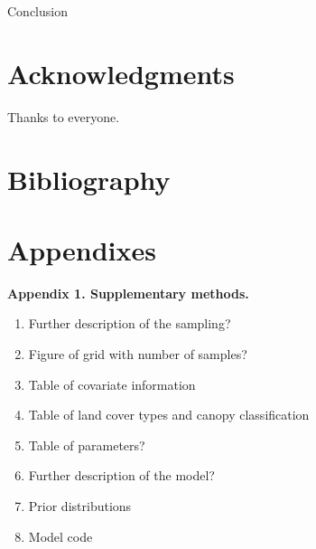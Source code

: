 \documentclass[preprint,review,times,12pt]{elsarticle}
\begin{document}
Conclusion



\section{Acknowledgments}
Thanks to everyone.

\newpage
\section{Bibliography}




\newpage
\section{Appendixes}
\textbf{Appendix 1. Supplementary methods.}
\begin{enumerate}
    \item Further description of the sampling?
    \item Figure of grid with number of samples?
    \item Table of covariate information
    \item Table of land cover types and canopy classification
    \item Table of parameters?
    \item Further description of the model?
    \item Prior distributions
    \item Model code
\end{enumerate}
\end{document}
